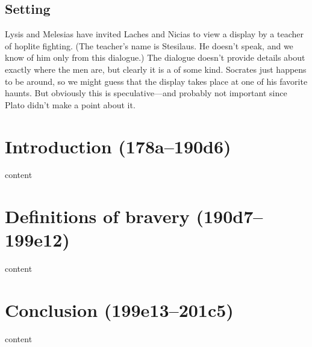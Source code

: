 \documentclass[11pt]{article}
\begin{document}
\subsection{Setting}

Lysis and Melesias have invited Laches and Nicias to view a display by a teacher of hoplite fighting.  (The teacher's name is Stesilaus.  He doesn't speak, and we know of him only from this dialogue.)  The dialogue doesn't provide details about exactly where the men are, but clearly it is a  of some kind.  Socrates just happens to be around, so we might guess that the display takes place at one of his favorite haunts.  But obviously this is speculative---and probably not important since Plato didn't make a point about it.

\section{Introduction (178a--190d6)}

content

\section{Definitions of bravery (190d7--199e12)}

content

\section{Conclusion (199e13--201c5)}

content


\newpage


\end{document}
